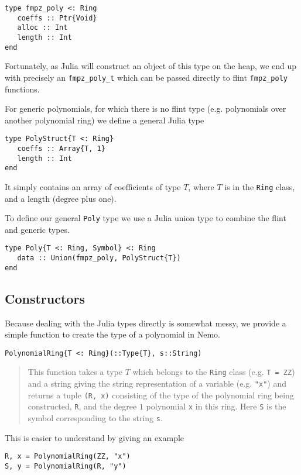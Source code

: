\documentclass[a4paper,10pt]{article}
\newcommand{\code}{\lstinline}
\newcommand{\desc}[1]{\vspace{-3mm}\begin{quote}#1\end{quote}}
\begin{document}
{{{{{{\begin{lstlisting}
type fmpz_poly <: Ring
   coeffs :: Ptr{Void}
   alloc :: Int
   length :: Int
end
\end{lstlisting}

Fortunately, as Julia will construct an object of this type on the heap, we end up with
precisely an \code{fmpz_poly_t} which can be passed directly to flint \code{fmpz_poly}
functions.

For generic polynomials, for which there is no flint type (e.g. polynomials over another
polynomial ring) we define a general Julia type

\begin{lstlisting}
type PolyStruct{T <: Ring}
   coeffs :: Array{T, 1}
   length :: Int
end
\end{lstlisting}

It simply contains an array of coefficients of type $T$, where $T$ is in the \code{Ring}
class, and a length (degree plus one).

To define our general \code{Poly} type we use a Julia union type to combine the flint
and generic types.

\begin{lstlisting}
type Poly{T <: Ring, Symbol} <: Ring
   data :: Union(fmpz_poly, PolyStruct{T})
end
\end{lstlisting}

\subsection{Constructors}

Because dealing with the Julia types directly is somewhat messy, we provide a simple
function to create the type of a polynomial in Nemo.

\begin{lstlisting}
PolynomialRing{T <: Ring}(::Type{T}, s::String)
\end{lstlisting}

\desc{This function takes a type $T$ which belongs to the \code|Ring| class 
(e.g. \code|T = ZZ|) and a string giving the string representation of a variable (e.g. 
\code|"x"|) and returns a tuple \code|(R, x)| consisting of the type of the polynomial
ring being constructed, \code|R|, and the degree $1$ polynomial \code|x| in this ring. 
Here \code|S| is the symbol corresponding to the string \code|s|.}

This is easier to understand by giving an example

\begin{lstlisting}
R, x = PolynomialRing(ZZ, "x")
S, y = PolynomialRing(R, "y")


\end{lstlisting}}}}}}}
\end{document}
